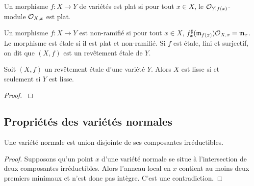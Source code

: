 \begin{defn}
Un morphisme $f:X\rightarrow Y$ de variétés est plat si pour tout $x\in X$, le $\mathcal{O}_{Y,f(x)}$-module $\mathcal{O}_{X,x}$ est plat.
\end{defn}


\begin{defn}
Un morphisme $f:X\rightarrow Y$ est non-ramifié si pour tout $x\in X$, $f^\sharp_x(\mathfrak{m}_{f(x)})\mathcal{O}_{X,x}=\mathfrak{m}_x$. Le morphisme est étale si il est plat et non-ramifié. Si $f$ est étale, fini et surjectif, on dit  que $(X,f)$ est un revêtement étale de $Y$.
\end{defn}


\begin{prop}\label{EtaleLisse}
Soit $(X,f)$ un revêtement étale d'une variété $Y$. Alors $X$ est lisse si et seulement si $Y$ est lisse.
\end{prop}
\begin{proof}
\cite[ex III.10.4]{Hartshorne}
\end{proof}

\subsection{Propriétés des variétés normales}

\begin{prop}\label{normaluniondisjointe}
Une variété normale est union disjointe de ses composantes irréductibles.
\end{prop}
\begin{proof}
Supposons qu'un point $x$ d'une variété normale se situe à l'intersection de deux composantes irréductibles. Alors l'anneau local en $x$ contient au moins deux premiers minimaux et n'est donc pas intègre. C'est une contradiction.
\end{proof}

